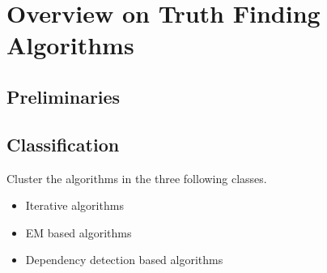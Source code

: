\section{Overview on Truth Finding Algorithms}
\subsection{Preliminaries}
\subsection{Classification}

Cluster the algorithms in the three following classes.
\begin{itemize}
 \item Iterative algorithms
 \item EM based algorithms
 \item Dependency detection based algorithms
\end{itemize}
